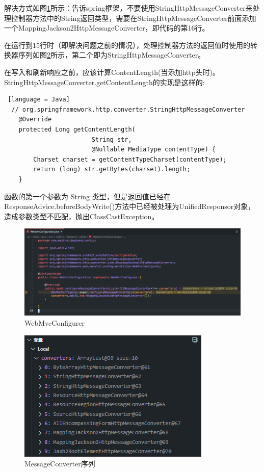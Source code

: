 解决方式如图\ref{WebMvcConfigurer}所示：告诉spring框架，不要使用StringHttpMessageConverter来处理控制器方法中的String返回类型，需要在StringHttpMessageConverter前面添加一个MappingJackson2HttpMessageConverter，即代码的第16行。

在运行到15行时（即解决问题之前的情况），处理控制器方法的返回值时使用的转换器序列如图\ref{MessageConverter-list}所示，第二个即为StringHttpMessageConverter。

在写入和刷新响应之前，应该计算ContentLength(当添加http头时)。StringHttpMessageConverter.getContentLength的实现是这样的:
\begin{lstlisting} [language = Java]
  // org.springframework.http.converter.StringHttpMessageConverter
	@Override
	protected Long getContentLength(
                        String str, 
                        @Nullable MediaType contentType) {
		Charset charset = getContentTypeCharset(contentType);
		return (long) str.getBytes(charset).length;
	}
\end{lstlisting}

函数的第一个参数为 String 类型，但是返回值已经在ResponseAdvice.beforeBodyWrite()方法中已经被处理为UnifiedResponsor对象，造成参数类型不匹配，抛出ClassCastException。

\begin{figure}[H]
  \centering
  \includegraphics[scale = 0.6]{out/figure/统一返回对象/WebMvcConfiguration-MessageConverter-Code.png}
  \caption{\song\wuhao WebMvcConfigurer}
  \label{WebMvcConfigurer}
\end{figure}

\begin{figure}[H]
  \centering
  \includegraphics[scale = 0.8]{out/figure/统一返回对象/WebMvcConfiguration-MessageConverter-debug.png}
  \caption{\song\wuhao MessageConverter序列}
  \label{MessageConverter-list}
\end{figure}

